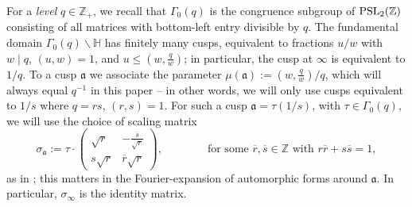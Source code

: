 \documentclass[reqno,11pt]{amsart}
\theoremstyle{remark}
\numberwithin{equation}{section}
\newcommand{\Z}{\mathbb{Z}}
\renewcommand{\H}{\mathbb{H}}
\newcommand{\ma}{\mathfrak{a}}
\newcommand{\PSL}{\textnormal{PSL}}
\renewcommand{\bar}{\overline}
\begin{document}
For a \emph{level} $q \in \Z_+$, we recall that $\Gamma_0(q)$ is the congruence subgroup of $\PSL_2(\Z)$ consisting of all matrices with bottom-left entry divisible by $q$. The fundamental domain $\Gamma_0(q)\backslash \H$ has finitely many cusps, equivalent to fractions $u/w$ with $w \mid q$, $(u, w) = 1$, and $u \le (w, \tfrac{q}{w})$; in particular, the cusp at $\infty$ is equivalent to $1/q$. To a cusp $\ma$ we associate the parameter $\mu(\ma) := (w, \tfrac{q}{w})/q$, which will always equal $q^{-1}$ in this paper -- in other words, we will only use cusps equivalent to $1/s$ where $q = rs$, $(r, s) = 1$. For such a cusp $\ma = \tau(1/s)$, with $\tau \in \Gamma_0(q)$, we will use the choice of scaling matrix 
\begin{equation} \label{eq:scaling-choices}
    \sigma_{\ma} := \tau \cdot \begin{pmatrix} 
    \sqrt{r} & -\frac{\bar{s}}{\sqrt{r}} \\
    s\sqrt{r} & \bar{r}\sqrt{r}
    \end{pmatrix},
    \qquad\qquad 
    \text{for some } \bar{r}, \bar{s} \in \Z \text{ with }
    r\bar{r} + s\bar{s} = 1,
\end{equation}
as in \cite[(3.9)]{pascadi2024large}; this matters in the Fourier-expansion of automorphic forms around $\ma$. In particular, $\sigma_\infty$ is the identity matrix.
\end{document}
